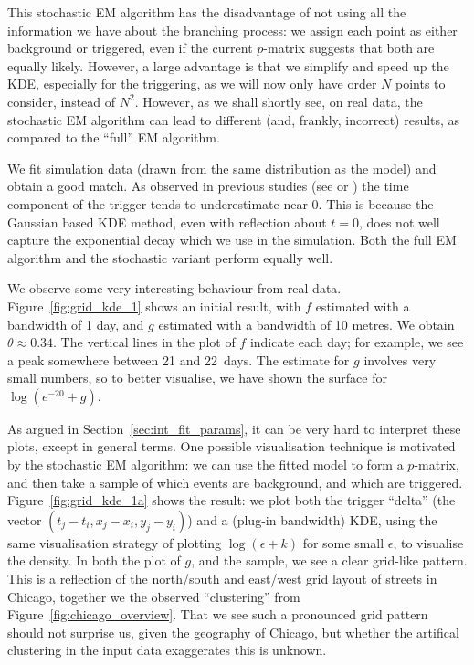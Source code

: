 \documentclass[twoside,a4paper]{article}
\theoremstyle{plain}
\theoremstyle{definition}
\begin{document}
This stochastic EM algorithm has the disadvantage of not using all the information we have about
the branching process: we assign each point as either background or triggered, even if the
current $p$-matrix suggests that both are equally likely.  However, a large advantage is that
we simplify and speed up the KDE, especially for the triggering, as we will now only have order
$N$ points to consider, instead of $N^2$.  However, as we shall shortly see, on real data,
the stochastic EM algorithm can lead to different (and, frankly, incorrect) results, as compared
to the ``full'' EM algorithm.

We fit simulation data (drawn from the same distribution as the model) and obtain a good match.
As observed in previous studies (see \cite{sepp2} or \cite[Figure~3]{rc}) the time component of
the trigger tends to underestimate near $0$.  This is because the Gaussian based KDE method,
even with reflection about $t=0$, does not well capture the exponential decay which we use
in the simulation.  Both the full EM algorithm and the stochastic variant perform equally well.

We observe some very interesting behaviour from real data.  Figure~\ref{fig:grid_kde_1} shows
an initial result, with $f$ estimated with a bandwidth of 1 day, and $g$ estimated with a bandwidth
of 10 metres.  We obtain $\theta\approx 0.34$.  The vertical lines in the plot of $f$ indicate
each day;
for example, we see a peak somewhere between 21 and 22~days.
The estimate for $g$ involves very small numbers, so to better visualise, we have shown the
surface for $\log(e^{-20}+g)$.

As argued in Section~\ref{sec:int_fit_params}, it can be very hard
to interpret these plots, except in general terms.  One possible visualisation technique is motivated
by the stochastic EM algorithm: we can use the fitted model to form a $p$-matrix, and then take
a sample of which events are background, and which are triggered.  Figure~\ref{fig:grid_kde_1a}
shows the result: we plot both the trigger ``delta'' (the vector $(t_j-t_i, x_j-x_i, y_j-y_i)$)
and a (plug-in bandwidth) KDE, using the same visualisation strategy of plotting $\log(\epsilon+k)$
for some small $\epsilon$, to visualise the density.  In both the plot of $g$, and the sample,
we see a clear grid-like pattern.  This is a reflection of the north/south and east/west grid
layout of streets in Chicago, together we the observed ``clustering'' from
Figure~\ref{fig:chicago_overview}.  That we see such a pronounced grid pattern should not surprise
us, given the geography of Chicago, but whether the artifical clustering in the input data
exaggerates this is unknown.
\end{document}

